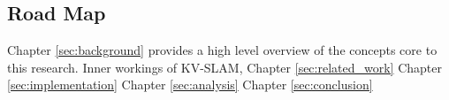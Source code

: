 \subsection{Road Map}

Chapter \ref{sec:background} provides a high level overview of the concepts core to this research. Inner workings of KV-SLAM, 
Chapter \ref{sec:related_work}
Chapter \ref{sec:implementation}
Chapter \ref{sec:analysis}
Chapter \ref{sec:conclusion}